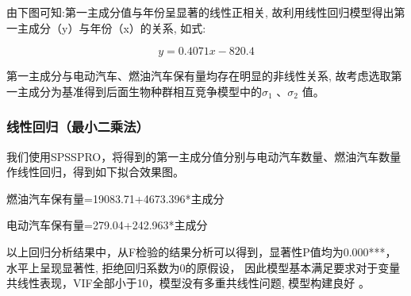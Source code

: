 \documentclass[]{article}
\begin{document}
由下图可知:第一主成分值与年份呈显著的线性正相关,
故利用线性回归模型得出第一主成分（y）与年份（x）的关系, 如式:

\begin{dmath}
  y=0.4071x-820.4
\end{dmath}


第一主成分与电动汽车、燃油汽车保有量均存在明显的非线性关系,
故考虑选取第一主成分为基准得到后面生物种群相互竞争模型中的$\sigma_1$
  、$\sigma_2$ 值。

\subsubsection{{线性回归（最小二乘法）}}

我们使用SPSSPRO，将得到的第一主成分值分别与电动汽车数量、燃油汽车数量作线性回归，得到如下拟合效果图。



燃油汽车保有量=19083.71+4673.396*主成分



电动汽车保有量=279.04+242.963*主成分

以上回归分析结果中，从F检验的结果分析可以得到，显著性P值均为0.000***，水平上呈现显著性,
拒绝回归系数为0的原假设，
因此模型基本满足要求对于变量共线性表现，VIF全部小于10，模型没有多重共线性问题,
模型构建良好 。
\end{document}
